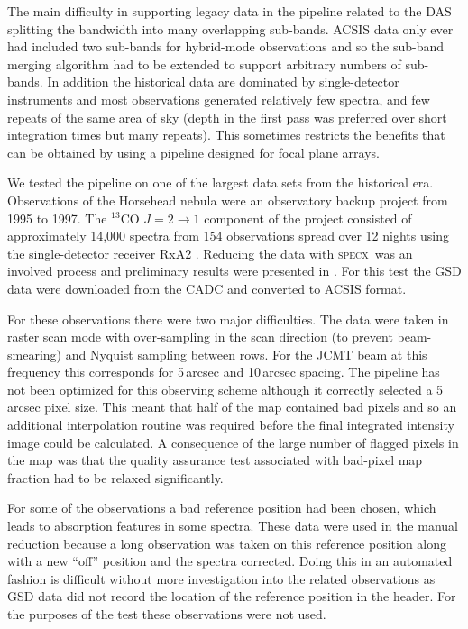 \documentclass[a4paper,fleqn,usenatbib]{mnras}
\newcommand{\specx}{\textsc{specx}}
\begin{document}
The main difficulty in supporting legacy data in the pipeline related
to the DAS splitting the bandwidth into many overlapping
sub-bands. ACSIS data only ever had included two sub-bands for hybrid-mode
observations and so the sub-band merging algorithm had to be
extended to support arbitrary numbers of sub-bands.  In addition the
historical data are dominated by single-detector instruments and most
observations generated relatively few spectra, and few repeats of the
same area of sky (depth in the first pass was preferred over short
integration times but many repeats). This sometimes
restricts the benefits that can be obtained by using a pipeline
designed for focal plane arrays.

We tested the pipeline on one of the largest data sets from the
historical era. Observations of the Horsehead nebula were an
observatory backup project from 1995 to 1997. The $^{13}$CO
$J=2\rightarrow 1$ component of the project consisted of approximately
14,000 spectra from 154 observations spread over 12 nights using the
single-detector receiver RxA2 \citep{1992IJIMW..13..647D}. Reducing
the data with \specx\ was an involved process and preliminary results
were presented in \citet{2001AAS...19915601S}. For this test the GSD data were
downloaded from the CADC and converted to ACSIS format.

For these observations there were two major difficulties. The data
were taken in raster scan mode with over-sampling in the scan
direction (to prevent beam-smearing) and Nyquist sampling between
rows. For the JCMT beam at this frequency this corresponds for
5\,arcsec and 10\,arcsec spacing. The pipeline has not been optimized
for this observing scheme although it correctly selected a 5\,arcsec
pixel size. This meant that half of the map contained bad pixels and
so an additional interpolation routine was required before the final
integrated intensity image could be calculated. A consequence of the
large number of flagged pixels in the map was that the quality
assurance test associated with bad-pixel map fraction had to be
relaxed significantly.

For some of the observations a bad reference position had been chosen,
which leads to absorption features in some spectra. These data were
used in the manual reduction because a long observation was taken on
this reference position along with a new ``off'' position and the
spectra corrected. Doing this in an automated fashion is difficult
without more investigation into the related observations as GSD data
did not record the location of the reference position in the
header. For the purposes of the test these observations were not used.
\end{document}
